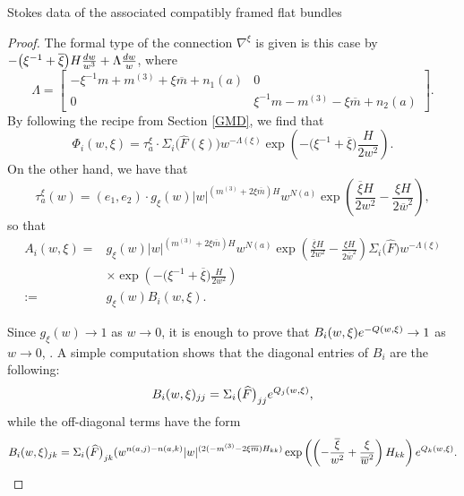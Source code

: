\documentclass[11pt]{article}
\numberwithin{equation}{section}
\numberwithin{equation}{section}
\begin{document}
\begin{subsubsection}{Stokes data of the associated compatibly framed flat bundles}
\begin{proof}
The formal type of the connection $\nabla^{\xi}$ is given is this case by
$
 -\bigl(\xi^{-1}+\overline{\xi}\bigr)H\frac{{\rm d}w}{w^3}+\Lambda\frac{{\rm d}w}{w}$,
where
\begin{equation*}
 \Lambda=\begin{bmatrix}-\xi^{-1}m +m^{(3)}+\xi \overline{m} +n_1(a) & 0\\
 0& \xi^{-1}m -m^{(3)}-\xi \overline{m} +n_2(a)
 \end{bmatrix}.
\end{equation*}
By following the recipe from Section \ref{GMD}, we find that
\begin{equation*}
 \Phi_i(w,\xi)=\tau_{a}^{\xi}\cdot\Sigma_i\bigl(\widehat{F}(\xi)\bigr) w^{-\Lambda(\xi)}\exp \left(-\bigl(\xi^{-1}+\overline{\xi}\bigr)\frac{H}{2w^2}\right).
\end{equation*}
On the other hand, we have that
\begin{equation*}
 \tau_{a}^{\xi}(w)=(e_1,e_2)\cdot g_{\xi}(w) |w|^{(m^{(3)}+2\xi \overline{m})H}w^{N(a)}\exp \left(\frac{\overline{\xi}H}{2w^2}-\frac{\xi H}{2\overline{w}^2}\right),
\end{equation*}
so that
\begin{align*}
 A_i(w,\xi)={}& g_{\xi}(w) |w|^{(m^{(3)}+2\xi \overline{m})H}w^{N(a)}\exp \left(\frac{\overline{\xi}H}{2w^2}-\frac{\xi H}{2\overline{w}^2}\right)\Sigma_i\bigl(\widehat{F}\bigr) w^{-\Lambda(\xi)}\\
 &\times\exp \left(-\bigl(\xi^{-1}+\overline{\xi}\bigr)\frac{H}{2w^2}\right)\\
:={}&g_{\xi}(w)B_i(w,\xi).
\end{align*}

Since $g_{\xi}(w)\to 1$ as $w \to 0$, it is enough to prove that $B_i(w,\xi){\rm e}^{-Q(w,\xi)}\to 1$ as $w\to 0$, . A simple computation shows that the diagonal entries of $B_i$ are the following:
\begin{equation*}
 B_{i}(w,\xi)_{jj}=\Sigma_{i}\bigl(\widehat{F}\bigr)_{jj}{\rm e}^{Q_j(w,\xi)},
\end{equation*}
while the off-diagonal terms have the form
\begin{equation*}
 B_{i}(w,\xi)_{jk}=\Sigma_{i}\bigl(\widehat{F}\bigr)_{jk}(w^{n(a,j)-n(a,k)}|w|^{(2(-m^{(3)}-2\xi \overline{m})H_{kk})}\exp \left(\left(-\frac{\overline{\xi}}{w^2}+\frac{\xi}{\overline{w}^2}\right)H_{kk}\right){\rm e}^{Q_k(w,\xi)}.
\end{equation*}


\end{proof}
\end{subsubsection}
\end{document}
